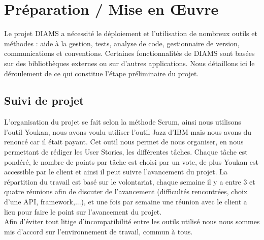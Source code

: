 \chapter{Préparation / Mise en Œuvre} %
Le projet DIAMS a nécessité le déploiement et l'utilisation de nombreux outils et méthodes : aide à 
la gestion,
tests, analyse de code, gestionnaire de version, communications et conventions. Certaines 
fonctionnalités de DIAMS sont basées sur des bibliothèques externes ou sur d'autres applications. 
Nous détaillons ici le déroulement de ce qui constitue l'étape préliminaire du projet.

\section{Suivi de projet}
L'organisation du projet se fait selon la méthode Scrum, ainsi nous utilisons l'outil
Youkan, nous avons voulu utiliser l'outil Jazz d'IBM mais nous avons du renoncé car il était payant.
Cet outil nous permet de nous organiser, en nous permettant de rédiger les User Stories,
les différentes tâches. Chaque tâche est pondéré, le nombre de points par tâche est choisi
par un vote, de plus Youkan est accessible par le client et ainsi il peut suivre l'avancement du
projet. La répartition du travail est basé sur le volontariat, chaque semaine il y a entre 3 et quatre
réunions afin de discuter de l'avancement (difficultés rencontrées, choix d'une API, framework,...),
et une fois par semaine une réunion avec le client a lieu pour faire le point sur l'avancement du projet.\\
Afin d'éviter tout litige d'incompatibilité entre les outils utilisé nous nous sommes mis d'accord
sur l'environnement de travail, commun à tous.



